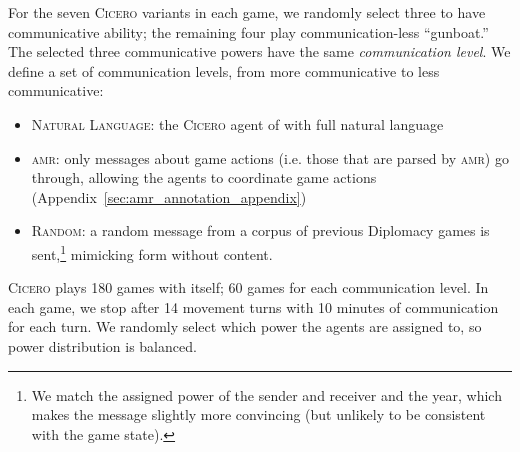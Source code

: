 \documentclass[oneside]{memoir}
\newcommand{\cicero}{\abr{Cicero} }
\newcommand{\abr}[1]{\textsc{#1}}
\begin{document}
%
%
% 
For the seven \cicero{} variants in each game, we randomly select three to have communicative
ability; the remaining four play communication-less ``gunboat.''
%
The selected three communicative powers have the same
\textit{communication level}. 
%
We define a set of communication
levels, from more communicative to less
communicative:

\begin{itemize}    
    \item \abr{Natural Language}: the \cicero{} agent of \citet{meta2022human} with full natural language
    \item \abr{amr}: only messages about game actions (i.e. those that are parsed by \abr{amr}) go through, allowing the agents to coordinate game actions (Appendix~\ref{sec:amr_annotation_appendix})
    \item \abr{Random}: a random message from a corpus of previous Diplomacy games is sent,\footnote{We match the assigned power of the sender and receiver and the year, which makes the message slightly more convincing (but unlikely to be consistent with the game state).} mimicking form without content. %
\end{itemize}
%
\cicero{} plays 180 games with itself; 60 games for each communication
level.
%
In each game, we stop after 14 movement turns with 10 minutes
of communication for each turn.
%
%
We randomly select which power the agents are assigned to, so  power distribution is balanced.
\end{document}
